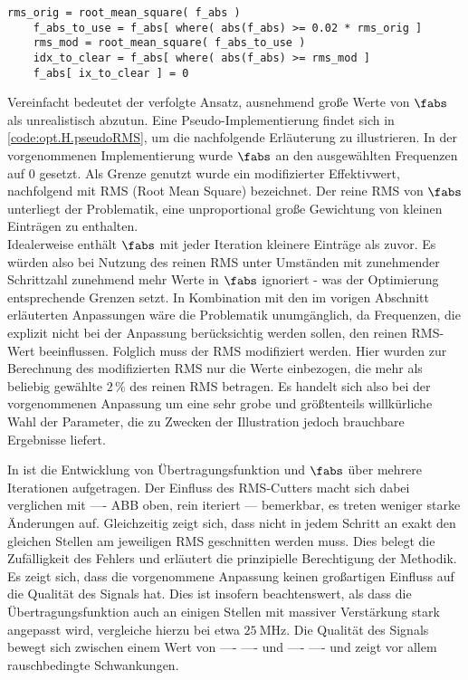\documentclass[../Report.tex]{subfiles}
\begin{document}
\lstset{language=Python}
\begin{lstlisting}[caption={Pseudocode zur Veranschaulichung der Anpassung des Korrekturterms}, label=code:opt.H.pseudoRMS, numbers=none]
	rms_orig = root_mean_square( f_abs )
	f_abs_to_use = f_abs[ where( abs(f_abs) >= 0.02 * rms_orig ] 
	rms_mod = root_mean_square( f_abs_to_use )
	idx_to_clear = f_abs[ where( abs(f_abs) >= rms_mod ] 
	f_abs[ ix_to_clear ] = 0
\end{lstlisting}

Vereinfacht bedeutet der verfolgte Ansatz, ausnehmend große Werte von $\fabs$ als unrealistisch abzutun. Eine Pseudo-Implementierung findet sich in \ref{code:opt.H.pseudoRMS}, um die nachfolgende Erläuterung zu illustrieren. In der vorgenommenen Implementierung wurde $\fabs$ an den ausgewählten Frequenzen auf $0$ gesetzt. Als Grenze genutzt wurde ein modifizierter Effektivwert, nachfolgend mit RMS (Root Mean Square) bezeichnet. 
Der reine RMS von $\fabs$ unterliegt der Problematik, eine unproportional große Gewichtung von kleinen Einträgen zu enthalten.
\\
Idealerweise enthält $\fabs$ mit jeder Iteration kleinere Einträge als zuvor. Es würden also bei Nutzung des reinen RMS unter Umständen mit zunehmender Schrittzahl zunehmend mehr Werte in $\fabs$ ignoriert - was der Optimierung entsprechende Grenzen setzt. 
In Kombination mit den im vorigen Abschnitt erläuterten Anpassungen wäre die Problematik unumgänglich, da Frequenzen, die explizit nicht bei der Anpassung berücksichtig werden sollen, den reinen RMS-Wert beeinflussen.
Folglich muss der RMS modifiziert werden. Hier wurden zur Berechnung des modifizierten RMS nur die Werte einbezogen, die mehr als beliebig gewählte $2 \, \%$ des reinen RMS betragen. Es handelt sich also bei der vorgenommenen Anpassung um eine sehr grobe und größtenteils willkürliche Wahl der Parameter, die zu Zwecken der Illustration jedoch brauchbare Ergebnisse liefert.
 

In  ist die Entwicklung von Übertragungsfunktion und $\fabs$ über mehrere Iterationen aufgetragen. Der Einfluss des RMS-Cutters macht sich dabei verglichen mit ---- ABB oben, rein iteriert --- bemerkbar, es treten weniger starke Änderungen auf. 
Gleichzeitig zeigt sich, dass nicht in jedem Schritt an exakt den gleichen Stellen am jeweiligen RMS geschnitten werden muss. Dies belegt die Zufälligkeit des Fehlers und erläutert die prinzipielle Berechtigung der Methodik.
Es zeigt sich, dass die vorgenommene Anpassung keinen großartigen Einfluss auf die Qualität des Signals hat.
Dies ist insofern beachtenswert, als dass die Übertragungsfunktion auch an einigen Stellen mit massiver Verstärkung stark angepasst wird, vergleiche hierzu  bei etwa $\SI{25}{\MHz}$.
Die Qualität des Signals bewegt sich zwischen einem Wert von ---- ---- und ---- ---- und zeigt vor allem rauschbedingte Schwankungen.
\end{document}
